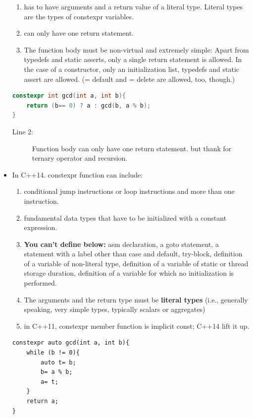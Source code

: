 \documentclass[a4paper,11pt,twoside]{book}
\begin{document}
\begin{itemize}
\begin{enumerate}
		\item has to have arguments and a return value of a literal type. Literal types are the types of constexpr variables.
		
		\item can only have one return statement.
		
		\item The function body must be non-virtual and extremely simple: Apart from typedefs and static asserts, only a single return statement is allowed. In the case of a constructor, only an initialization list, typedefs and static assert are allowed. (= default and = delete are allowed, too, though.)
	\end{enumerate}

\begin{lstlisting}[frame=single, language=c++]
constexpr int gcd(int a, int b){
	return (b== 0) ? a : gcd(b, a % b);
}
\end{lstlisting}
\begin{description}
	\item[Line 2:] Function body can only have one return statement. but thank for ternary operator and recursion.
\end{description}
	
	\item In C++14. constexpr function can include: 
	\begin{enumerate}
		\item conditional jump instructions or loop instructions and more than one instruction.
		
		\item fundamental data types that have to be initialized with a constant expression.
		
		\item \textbf{You can't define below:} asm declaration, a goto statement, a statement with a label other than case and default, try-block, definition of a variable of non-literal type, definition of a variable of static or thread storage duration, definition of a variable for which no initialization is performed.
		
		\item The arguments and the return type must be \textbf{literal types} (i.e., generally speaking, very simple types, typically scalars or aggregates)
		
		\item in C++11, constexpr member function is implicit const; C++14 lift it up.
	\end{enumerate}
\begin{lstlisting}[numbers=none]
constexpr auto gcd(int a, int b){
	while (b != 0){
		auto t= b;
		b= a % b;
		a= t;
	}
	return a;
}
\end{lstlisting}
	

\end{itemize}
\end{document}
